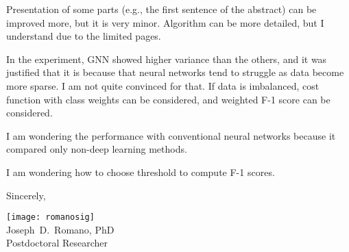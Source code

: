 \documentclass{ibilttr}
\begin{document}
\vspace{-1em}
\begin{displayquote}
Presentation of some parts (e.g., the first sentence of the abstract)
can be improved more, but it is very minor. Algorithm can be more
detailed, but I understand due to the limited pages.
\end{displayquote}

\begin{displayquote}
In the experiment, GNN showed higher variance than the others,
and it was justified that it is because that neural networks tend to
struggle as data become more sparse. I am not quite convinced for
that. If data is imbalanced, cost function with class weights can be
considered, and weighted F-1 score can be considered.
\end{displayquote}

\begin{displayquote}
I am wondering the performance with conventional neural networks
because it compared only non-deep learning methods.
\end{displayquote}

\begin{displayquote}
I am wondering how to choose threshold to compute F-1 scores.
\end{displayquote}

\vspace{2ex} Sincerely,

\texttt{[image: romanosig]}\\[-0.2\baselineskip]

Joseph~D.~Romano, PhD\\ Postdoctoral Researcher
\end{document}
